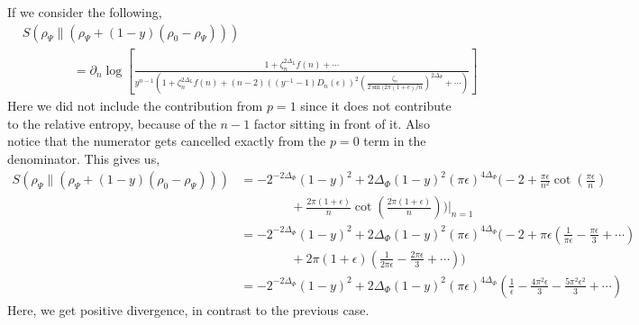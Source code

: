 \documentclass[11pt]{article}
\newcommand{\ep}{\epsilon}
\newcommand{\p}{\partial}
\newcommand{\nn}{\nonumber}
\newcommand{\lb}{\left(}
\newcommand{\rb}{\right)}
\begin{document}

If we consider the following,
\begin{align}
   & S
(\rho_\Psi \|( \rho_\Psi + (1-y)(\rho_0 - \rho_\Psi))) \\&\qquad\qquad= \p_n \log \left[\frac{1+\zeta_n^{2\Delta_L}f(n) + \cdots}{y^{n-1}\lb 1+\zeta_n^{2\Delta_L}f(n) + (n-2)\lb (y^{-1}-1)D_n(\ep)\rb^2 \lb\frac{\zeta_n}{2\sin(2\pi(1+\ep)/n}\rb^{2\Delta_\Phi} +\cdots\rb}\right]
\end{align}
Here we did not include the contribution from $p=1$ since it does not contribute to the relative entropy, because of the $n-1$ factor sitting in front of it. Also notice that the numerator gets cancelled exactly from the $p=0$ term in the denominator. This gives us,
\begin{align}
    S
(\rho_\Psi \|( \rho_\Psi + (1-y)(\rho_0 - \rho_\Psi))) &=-2^{-2\Delta_\Phi}(1-y)^2 + 2\Delta_\Phi (1-y)^2 (\pi \ep)^{4\Delta_\Phi}\Bigg( -2  + \frac{\pi \ep}{n^2} \cot \lb\frac{\pi \ep}{n}\rb   \nn\\
    &\qquad\qquad +\frac{2\pi (1+\ep)}{n} \cot \lb\frac{2\pi (1+\ep)}{n}\rb \Bigg)\Big|_{n=1}\\
    &= -2^{-2\Delta_\Phi}(1-y)^2 + 2\Delta_\Phi (1-y)^2 (\pi \ep)^{4\Delta_\Phi}\Bigg( -2 + \pi \ep \lb \frac{1}{\pi \ep} - \frac{\pi \ep}{3} + \cdots\rb \nn\\
    &\qquad \qquad + 2\pi (1+\ep)\lb \frac{1}{2\pi \ep} - \frac{2\pi \ep}{3} + \cdots \rb\Bigg)\\
    &= -2^{-2\Delta_\Phi}(1-y)^2 + 2\Delta_\Phi (1-y)^2 (\pi \ep)^{4\Delta_\Phi}\lb \frac{1}{\ep} - \frac{4\pi^2 \ep}{3} - \frac{5\pi^2 \ep^2}{3} + \cdots \rb
\end{align}
Here, we get positive divergence, in contrast to the previous case. 
\end{document}
